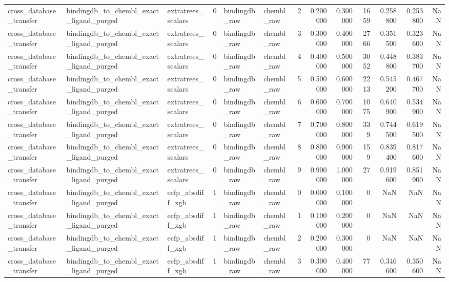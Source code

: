 \begin{longtable}{lllrllrrrrrrr}
cross\_database\_transfer & bindingdb\_to\_chembl\_exact\_ligand\_purged & extratrees\_scalars & 0 & bindingdb\_raw & chembl\_raw & 2 & 0.200000 & 0.300000 & 1659 & 0.258800 & 0.253800 & NaN \\
cross\_database\_transfer & bindingdb\_to\_chembl\_exact\_ligand\_purged & extratrees\_scalars & 0 & bindingdb\_raw & chembl\_raw & 3 & 0.300000 & 0.400000 & 2766 & 0.351500 & 0.323600 & NaN \\
cross\_database\_transfer & bindingdb\_to\_chembl\_exact\_ligand\_purged & extratrees\_scalars & 0 & bindingdb\_raw & chembl\_raw & 4 & 0.400000 & 0.500000 & 3052 & 0.448800 & 0.383700 & NaN \\
cross\_database\_transfer & bindingdb\_to\_chembl\_exact\_ligand\_purged & extratrees\_scalars & 0 & bindingdb\_raw & chembl\_raw & 5 & 0.500000 & 0.600000 & 2213 & 0.545200 & 0.467700 & NaN \\
cross\_database\_transfer & bindingdb\_to\_chembl\_exact\_ligand\_purged & extratrees\_scalars & 0 & bindingdb\_raw & chembl\_raw & 6 & 0.600000 & 0.700000 & 1075 & 0.640900 & 0.534900 & NaN \\
cross\_database\_transfer & bindingdb\_to\_chembl\_exact\_ligand\_purged & extratrees\_scalars & 0 & bindingdb\_raw & chembl\_raw & 7 & 0.700000 & 0.800000 & 339 & 0.744500 & 0.619500 & NaN \\
cross\_database\_transfer & bindingdb\_to\_chembl\_exact\_ligand\_purged & extratrees\_scalars & 0 & bindingdb\_raw & chembl\_raw & 8 & 0.800000 & 0.900000 & 159 & 0.839400 & 0.817600 & NaN \\
cross\_database\_transfer & bindingdb\_to\_chembl\_exact\_ligand\_purged & extratrees\_scalars & 0 & bindingdb\_raw & chembl\_raw & 9 & 0.900000 & 1.000000 & 27 & 0.919600 & 0.851900 & NaN \\
cross\_database\_transfer & bindingdb\_to\_chembl\_exact\_ligand\_purged & ecfp\_absdiff\_xgb & 1 & bindingdb\_raw & chembl\_raw & 0 & 0.000000 & 0.100000 & 0 & NaN & NaN & NaN \\
cross\_database\_transfer & bindingdb\_to\_chembl\_exact\_ligand\_purged & ecfp\_absdiff\_xgb & 1 & bindingdb\_raw & chembl\_raw & 1 & 0.100000 & 0.200000 & 0 & NaN & NaN & NaN \\
cross\_database\_transfer & bindingdb\_to\_chembl\_exact\_ligand\_purged & ecfp\_absdiff\_xgb & 1 & bindingdb\_raw & chembl\_raw & 2 & 0.200000 & 0.300000 & 0 & NaN & NaN & NaN \\
cross\_database\_transfer & bindingdb\_to\_chembl\_exact\_ligand\_purged & ecfp\_absdiff\_xgb & 1 & bindingdb\_raw & chembl\_raw & 3 & 0.300000 & 0.400000 & 77 & 0.346600 & 0.350600 & NaN \\

\end{longtable}
